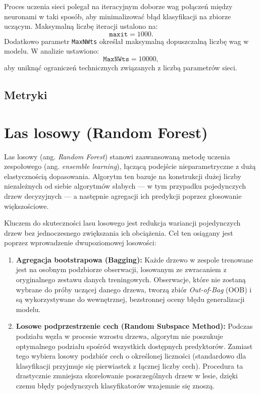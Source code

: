 \documentclass{report}
\begin{document}
Proces uczenia sieci polegał na iteracyjnym doborze wag połączeń między neuronami w taki sposób, aby minimalizować błąd klasyfikacji na zbiorze uczącym. Maksymalną liczbę iteracji ustalono na:
\[
\texttt{maxit} = 1000.
\]
Dodatkowo parametr \texttt{MaxNWts} określał maksymalną dopuszczalną liczbę wag w modelu. W analizie ustawiono:
\[
\texttt{MaxNWts} = 10000,
\]
aby uniknąć ograniczeń technicznych związanych z liczbą parametrów sieci.

\subsection*{Metryki}




\section{Las losowy (Random Forest)}

Las losowy (ang. \textit{Random Forest}) stanowi zaawansowaną metodę uczenia zespołowego (ang. \textit{ensemble learning}), łączącą podejście nieparametryczne z dużą elastycznością dopasowania. Algorytm ten bazuje na konstrukcji dużej liczby niezależnych od siebie algorytmów słabych — w tym przypadku pojedynczych drzew decyzyjnych — a następnie agregacji ich predykcji poprzez głosowanie większościowe.

Kluczem do skuteczności lasu losowego jest redukcja wariancji pojedynczych drzew bez jednoczesnego zwiększania ich obciążenia. Cel ten osiągany jest poprzez wprowadzenie dwupoziomowej losowości:
\begin{enumerate}
    \item \textbf{Agregacja bootstrapowa (Bagging):} Każde drzewo w zespole trenowane jest na osobnym podzbiorze obserwacji, losowanym ze zwracaniem z oryginalnego zestawu danych treningowych. Obserwacje, które nie zostaną wybrane do próby uczącej danego drzewa, tworzą zbiór \textit{Out-of-Bag} (OOB) i są wykorzystywane do wewnętrznej, bezstronnej oceny błędu generalizacji modelu.
    \item \textbf{Losowe podprzestrzenie cech (Random Subspace Method):} Podczas podziału węzła w procesie wzrostu drzewa, algorytm nie poszukuje optymalnego podziału spośród wszystkich dostępnych predyktorów. Zamiast tego wybiera losowy podzbiór cech o określonej liczności (standardowo dla klasyfikacji przyjmuje się pierwiastek z łącznej liczby cech). Procedura ta drastycznie zmniejsza skorelowanie poszczególnych drzew w lesie, dzięki czemu błędy pojedynczych klasyfikatorów wzajemnie się znoszą.
\end{enumerate}
\end{document}
